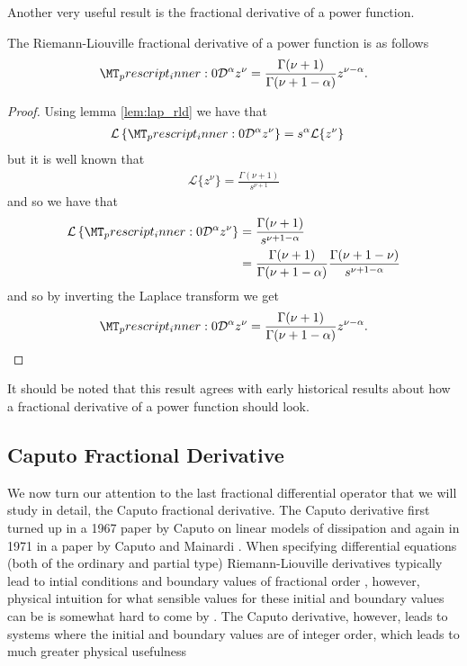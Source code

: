 Another very useful result is the fractional derivative of a power function. 
\begin{mdframed}[innertopmargin=10pt]
    \begin{lemma}
        \label{lem:rld_power}
        The Riemann-Liouville fractional derivative of a power function is as follows
        \begin{align*}
            \prescript{}{0}{\mathcal{D}}^\alpha z^{\nu} = \frac{\Gamma(\nu+1)}{\Gamma(\nu + 1 -\alpha)} z^{\nu - \alpha}.
        \end{align*}
    \end{lemma}
\end{mdframed}
\begin{proof}
    Using lemma \ref{lem:lap_rld} we have that
    \begin{align*}
        \mathcal{L}\left\{ \prescript{}{0}{\mathcal{D}}^\alpha z^{\nu} \right\} &= s^\alpha \mathcal{L}\{ z^\nu \}
    \end{align*}
    but it is well known that
    \begin{align*}
        \mathcal{L}\{ z^\nu \} = \frac{\Gamma(\nu + 1)}{s^{\nu + 1}}
    \end{align*}
    and so we have that
    \begin{align*}
        \mathcal{L}\left\{ \prescript{}{0}{\mathcal{D}}^\alpha z^{\nu} \right\} &= \frac{\Gamma(\nu+1)}{s^{\nu + 1 - \alpha}} \\
            &= \frac{\Gamma(\nu+1)}{\Gamma(\nu + 1 - \alpha)} \frac{\Gamma(\nu + 1 - \nu)}{s^{\nu + 1 - \alpha}}
    \end{align*}
    and so by inverting the Laplace transform we get
    \begin{align*}
        \prescript{}{0}{\mathcal{D}}^\alpha z^{\nu}  = \frac{\Gamma(\nu + 1)}{\Gamma(\nu+1-\alpha)}z^{\nu - \alpha}.
    \end{align*}
\end{proof}
It should be noted that this result agrees with early historical results about how a fractional derivative of a power function should look.

\subsection{Caputo Fractional Derivative}
\label{subsec:caputo}
We now turn our attention to the last fractional differential operator that we will study in detail, the Caputo fractional derivative. 
The Caputo derivative first turned up in a 1967 paper by Caputo on linear models of dissipation \cite{Caputo1967} and again in 1971 in a paper by Caputo and Mainardi \cite{Caputo1971}.  When specifying differential equations (both of the ordinary and partial type) Riemann-Liouville derivatives typically lead to intial conditions and boundary values of fractional order \cite{Caputo1971, Podlubny1999, Samko1993, Heymans2005}, however, physical intuition for what sensible values for these initial and boundary values can be is somewhat hard to come by \cite{Caputo1971, Podlubny1999, Samko1993, Gorenflo1997}. The Caputo derivative, however, leads to systems where the initial and boundary values are of integer order, which leads to much greater physical usefulness \cite{Podlubny1999, Samko1993, Gorenflo1997}


